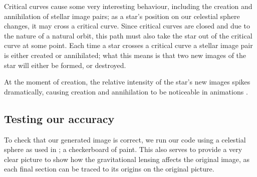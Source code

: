 \documentclass[oneside,openright,frontopenright, singlespacing]{dmathesis}
\begin{document}
\vspace{1em}
	Critical curves cause some very interesting behaviour, including the creation and annihilation of stellar image pairs; as a star's position on our celestial sphere changes, it may cross a critical curve. Since critical curves are closed and due to the nature of a natural orbit, this path must also take the star out of the critical curve at some point. Each time a star crosses a critical curve a stellar image pair is either created or annihilated; what this means is that two new images of the star will either be formed, or destroyed. 

\vspace{1em}
	At the moment of creation, the relative intensity of the star's new images spikes dramatically, causing creation and annihilation to be noticeable in animations \cite{thorne2015gravitational}.

\subsection{Testing our accuracy}\label{subsec:SubSection4.8.3}

	To check that our generated image is correct, we run our code using a celestial sphere as used in \cite{thorne2015gravitational}; a checkerboard of paint. This also serves to provide a very clear picture to show how the gravitational lensing affects the original image, as each final section can be traced to its origins on the original picture.
\end{document}
